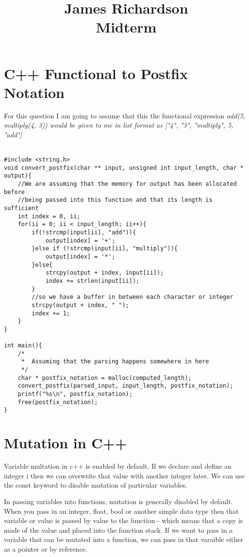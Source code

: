 \documentclass[11pt]{article}
\begin{document}
\title{James Richardson\\Midterm}
\maketitle

\newpage
\section{C++ Functional to Postfix Notation}
For this question I am going to assume that this the functional expression
\it{add(5, multiply(4, 3))} \rm{would be given to me in list format as}
\it{["4", "3", "multiply", 5, "add"]}
\rm\\\\

\begin{lstlisting}[style=MyC++]
#include <string.h>
void convert_postfix(char ** input, unsigned int input_length, char * output){
    //We are assuming that the memory for output has been allocated before
    //being passed into this function and that its length is sufficient
    int index = 0, ii;
    for(ii = 0; ii < input_length; ii++){
        if(!strcmp(input[ii], "add")){
            output[index] = '+';
        }else if (!strcmp(input[ii], "multiply")){
            output[index] = '*';
        }else{
            strcpy(output + index, input[ii]);
            index += strlen(input[ii]);
        }
        //so we have a buffer in between each character or integer
        strcpy(output + index, " ");
        index += 1;
    }
}

int main(){
    /*
     *  Assuming that the parsing happens somewhere in here
     */
    char * postfix_notation = malloc(computed_length);
    convert_postfix(parsed_input, input_length, postfix_notation);
    printf("%s\n", postfix_notation);
    free(postfix_notation);
}
\end{lstlisting}

\newpage

\section{Mutation in C++}
Variable multation in c++ is enabled by default.  If we declare and define an
integer i then we can overwrite that value with another integer later.
We can use the const keyword to disable mutation of particular variables.

In passing variables into functions, mutation is generally disabled by default.
When you pass in an integer, float, bool or another simple data type then that
variable or value is passed by value to the function - which means that a copy
is made of the value and placed into the function stack.  If we want to pass in
a variable that can be mutated into a function, we can pass in that varaible
either as a pointer or by reference.
\end{document}
